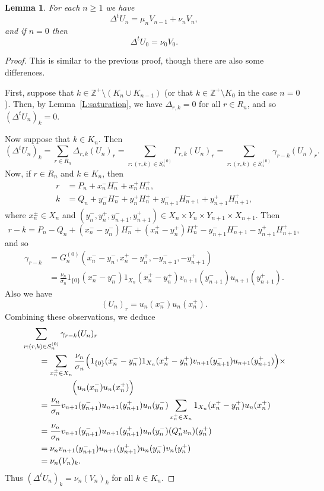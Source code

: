 \documentclass[11pt,reqno]{amsart}
\theoremstyle{plain}
\newtheorem{lemma}[theorem]{Lemma}
\theoremstyle{definition}
\theoremstyle{remark}
\newcommand{\ZZ}{\mathbb{Z}}
\begin{document}
\begin{lemma}\label{L:DeltatUcalc}
For each $n\ge1$ we have
\[
\Delta^t U_n=\mu_n V_{n-1}+\nu_nV_n,
\]
and if $n=0$ then
\[
\Delta^t U_0=\nu_0V_0.
\]
\end{lemma}

\begin{proof}
This is similar to the previous proof, though there are also
some differences.

First, suppose that $k\in \ZZ^+\setminus(K_n\cup K_{n-1})$
(or that $k\in\ZZ^+\setminus K_0$ in the case $n=0$). 
Then, by Lemma~\ref{L:saturation}, we have $\Delta_{r,k}=0$ for all $r\in R_n$, and so $(\Delta^t U_n)_k=0$.

Now suppose that $k\in K_n$. Then
\[
(\Delta^t U_n)_k=\sum_{r\in R_n}\Delta_{r,k}(U_n)_r
=\sum_{r:(r,k)\in S_n^{(0)}}\Gamma_{r,k}(U_n)_r
=\sum_{r:(r,k)\in S_n^{(0)}}\gamma_{r-k}(U_n)_r.
\]
Now, if $r\in R_n$ and $k\in K_n$, then
\begin{align*}
r&=P_n+x_n^{-}H_n^-+x_n^+H_n^+,\\
k&=Q_n+y_n^-H_n^-+y_n^+H_n^++y_{n+1}^-H_{n+1}^-+y_{n+1}^+H_{n+1}^+,
\end{align*}
where $x_n^\pm\in X_n$ and $(y_n^-,y_n^+,y_{n+1}^-,y_{n+1}^+)\in X_n\times Y_n\times Y_{n+1}\times X_{n+1}$.
Then
\[
r-k=P_n-Q_n+(x_n^--y_n^-)H_n^-+(x_n^+-y_n^+)H_n^+-y_{n+1}^-H_{n+1}^--y_{n+1}^+H_{n+1}^+,
\]
and so
\begin{align*}
\gamma_{r-k}
&=G_n^{(0)}(x_n^--y_n^-,x_n^+-y_n^+,-y_{n+1}^-,-y_{n+1}^+)\\
&=\frac{\nu_n}{\sigma_n}1_{\{0\}}(x_n^--y_n^-)1_{X_n}(x_n^+-y_n^+)v_{n+1}(y_{n+1}^-)u_{n+1}(y_{n+1}^+).
\end{align*}
Also we have
\[
(U_n)_r=u_n(x_n^-)u_n(x_n^+).
\]
Combining these observations, we deduce
\begin{align*}
&\sum_{r:(r,k)\in S_n^{(0)}}\gamma_{r-k}(U_n)_r\\
&\qquad=\sum_{x_n^\pm\in X_n}\frac{\nu_n}{\sigma_n}\Bigl(1_{\{0\}}(x_n^--y_n^-)1_{X_n}(x_n^+-y_n^+)v_{n+1}(y_{n+1}^-)u_{n+1}(y_{n+1}^+)\Bigr)\times\\
&\qquad\qquad\qquad\Bigl(u_n(x_n^-)u_n(x_n^+)\Bigr)\\
&\qquad=\frac{\nu_n}{\sigma_n}v_{n+1}(y_{n+1}^-)u_{n+1}(y_{n+1}^+)u_{n}(y_n^-)\sum_{x_n^+\in X_n}1_{X_n}(x_n^+-y_n^+)u_n(x_n^+)\\
&\qquad=\frac{\nu_n}{\sigma_n}v_{n+1}(y_{n+1}^-)u_{n+1}(y_{n+1}^+)u_{n}(y_n^-)(Q_n^*u_n)(y_n^+)\\
&\qquad=\nu_n v_{n+1}(y_{n+1}^-)u_{n+1}(y_{n+1}^+)u_{n}(y_n^-)v_n(y_n^+)\\
&\qquad=\nu_n(V_n)_k.
\end{align*}
Thus $(\Delta^t U_n)_k=\nu_n(V_n)_k$ for all $k\in K_n$.


\end{proof}
\end{document}

